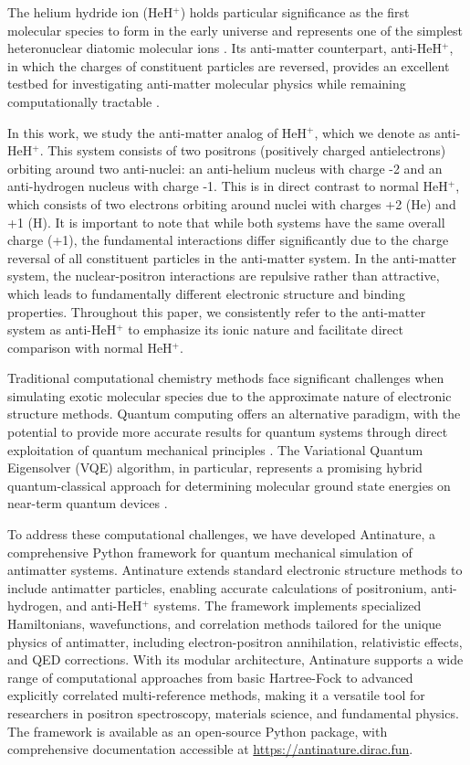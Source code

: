 \documentclass[10pt,twocolumn,a4paper]{article}
\begin{document}
The helium hydride ion (HeH$^+$) holds particular significance as the first molecular species to form in the early universe and represents one of the simplest heteronuclear diatomic molecular ions \cite{lee2019first}. Its anti-matter counterpart, anti-HeH$^+$, in which the charges of constituent particles are reversed, provides an excellent testbed for investigating anti-matter molecular physics while remaining computationally tractable \cite{czachorowski2020towards}.

In this work, we study the anti-matter analog of HeH$^+$, which we denote as anti-HeH$^+$. This system consists of two positrons (positively charged antielectrons) orbiting around two anti-nuclei: an anti-helium nucleus with charge -2 and an anti-hydrogen nucleus with charge -1. This is in direct contrast to normal HeH$^+$, which consists of two electrons orbiting around nuclei with charges +2 (He) and +1 (H). It is important to note that while both systems have the same overall charge (+1), the fundamental interactions differ significantly due to the charge reversal of all constituent particles in the anti-matter system. In the anti-matter system, the nuclear-positron interactions are repulsive rather than attractive, which leads to fundamentally different electronic structure and binding properties. Throughout this paper, we consistently refer to the anti-matter system as anti-HeH$^+$ to emphasize its ionic nature and facilitate direct comparison with normal HeH$^+$.

Traditional computational chemistry methods face significant challenges when simulating exotic molecular species due to the approximate nature of electronic structure methods. Quantum computing offers an alternative paradigm, with the potential to provide more accurate results for quantum systems through direct exploitation of quantum mechanical principles \cite{cao2019quantum}. The Variational Quantum Eigensolver (VQE) algorithm, in particular, represents a promising hybrid quantum-classical approach for determining molecular ground state energies on near-term quantum devices \cite{peruzzo2014variational, mcclean2016theory}.

To address these computational challenges, we have developed Antinature, a comprehensive Python framework for quantum mechanical simulation of antimatter systems. Antinature extends standard electronic structure methods to include antimatter particles, enabling accurate calculations of positronium, anti-hydrogen, and anti-HeH$^+$ systems. The framework implements specialized Hamiltonians, wavefunctions, and correlation methods tailored for the unique physics of antimatter, including electron-positron annihilation, relativistic effects, and QED corrections. With its modular architecture, Antinature supports a wide range of computational approaches from basic Hartree-Fock to advanced explicitly correlated multi-reference methods, making it a versatile tool for researchers in positron spectroscopy, materials science, and fundamental physics. The framework is available as an open-source Python package, with comprehensive documentation accessible at \url{https://antinature.dirac.fun}.
\end{document}

